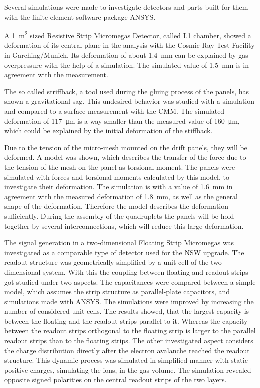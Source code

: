 \documentclass[
a4paper,                                %
twoside,                                %
BCOR1.4cm,                      %
10pt,                           %
headings=normal,                %
headsepline,                    %
clearplainpage, %
final,                                  %
div=14,
parskip=full,
openright,
bibliography=toc
]{scrreprt}
\begin{document}
Several simulations were made to investigate detectors and parts built for them with the finite element software-package ANSYS. 

A \SI{1}{\square\m} sized Resistive Strip Micromegas Detector, called L1 chamber, showed a deformation of its central plane in the analysis with the Cosmic Ray Test Facility in Garching/Munich. Its deformation of about \SI{1.4}{\mm} can be explained by gas overpressure with the help of a simulation. The simulated value of \SI{1.5}{\mm} is in agreement with the measurement. 

The so called striffback, a tool used during the gluing process of the panels, has shown a gravitational sag. This undesired behavior was studied with a simulation and compared to a surface measurement with the CMM. The simulated deformation of \SI{117}{\micro\m} is a way smaller than the measured value of \SI{160}{\micro\m}, which could be explained by the initial deformation of the stiffback. 

Due to the tension of the micro-mesh mounted on the drift panels, they will be deformed. A model was shown, which describes the transfer of the force due to the tension of the mesh on the panel as torsional moment. The panels were simulated with forces and torsional moments calculated by this model, to investigate their deformation. The simulation is with a value of \SI{1.6}{\mm} in agreement with the measured deformation of \SI{1.8}{\mm}, as well as the general shape of the deformation. Therefore the model describes the deformation sufficiently. During the assembly of the quadruplets the panels will be hold together by several interconnections, which will reduce this large deformation. 

The signal generation in a two-dimensional Floating Strip Micromegas was investigated as a comparable type of detector used for the NSW upgrade. The readout structure was geometrically simplified by a unit cell of the two dimensional system. With this the coupling between floating and readout strips got studied under two aspects. The capacitances were compared between a simple model, which assumes the strip structure as parallel-plate capacitors, and simulations made with ANSYS. The simulations were improved by increasing the number of considered unit cells. The results showed, that the largest capacity is between the floating and the readout strips parallel to it. Whereas the capacity between the readout strips orthogonal to the floating strip is larger to the parallel readout strips than to the floating strips. The other investigated aspect considers the charge distribution directly after the electron avalanche reached the readout structure. This dynamic process was simulated in simplified manner with static positive charges, simulating the ions, in the gas volume. The simulation revealed opposite signed polarities on the central readout strips of the two layers. 
\end{document}
